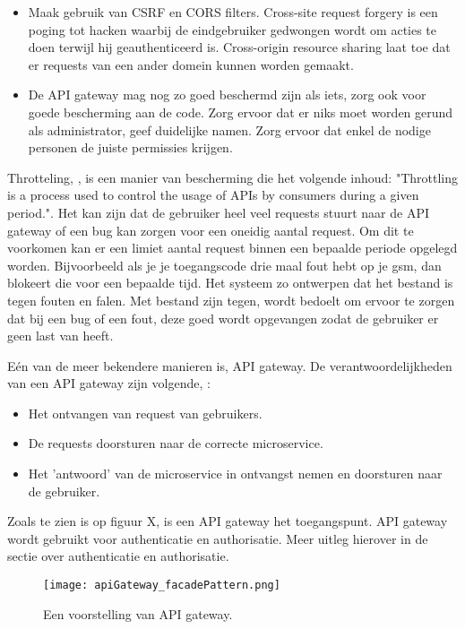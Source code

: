 \begin{itemize}
	\item Maak gebruik van CSRF en CORS filters. Cross-site request forgery is een poging tot hacken waarbij de eindgebruiker gedwongen wordt om acties te doen terwijl hij geauthenticeerd is. Cross-origin resource sharing laat toe dat er requests van een ander domein kunnen worden gemaakt. 
	\item De API gateway mag nog zo goed beschermd zijn als iets, zorg ook voor goede bescherming aan de code. Zorg ervoor dat er niks moet worden gerund als administrator, geef duidelijke namen. Zorg ervoor dat enkel de nodige personen de juiste permissies krijgen. 
\end{itemize}

Throtteling, \textcite{Cavalcanti2018}, is een manier van bescherming die het volgende inhoud: "Throttling is a process used to control the usage of APIs by consumers during a given period.". Het kan zijn dat de gebruiker heel veel requests stuurt naar de API gateway of een bug kan zorgen voor een oneidig aantal request. Om dit te voorkomen kan er een limiet aantal request  binnen een bepaalde periode opgelegd worden. Bijvoorbeeld als je je toegangscode drie maal fout hebt op je gsm, dan blokeert die voor een bepaalde tijd. Het systeem zo ontwerpen dat het bestand is tegen fouten en falen. Met bestand zijn tegen, wordt bedoelt om ervoor te zorgen dat bij een bug of een fout, deze goed wordt opgevangen zodat de gebruiker er geen last van heeft. 

Eén van de meer bekendere manieren is, API gateway. De verantwoordelijkheden van een API gateway zijn volgende, \textcite{Siraj2017}:
\begin{itemize}
	\item Het ontvangen van request van gebruikers.
	\item De requests doorsturen naar de correcte microservice.
	\item Het 'antwoord' van de microservice in ontvangst nemen en doorsturen naar de gebruiker.
\end{itemize}
Zoals te zien is op figuur X, is een API gateway het toegangspunt. API gateway wordt gebruikt voor authenticatie en authorisatie. Meer uitleg hierover in de sectie over authenticatie en authorisatie.
\begin{figure}[h]
	\texttt{[image: apiGateway\_facadePattern.png]}
	\centering
	\caption{Een voorstelling van API gateway. \textcite{Siraj2017}}
\end{figure}


